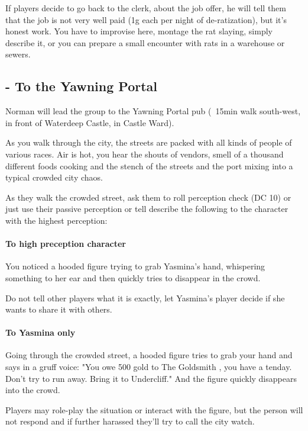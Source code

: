 \documentclass[10pt,onecolumn,twoside,openany,bg=full,layout=true]{dndbook}
\begin{document}
If players decide to go back to the clerk, about the job offer, he will tell them that the job is not very well paid (1g each per night of de-ratization), but it's honest work.
You have to improvise here, montage the rat slaying, simply describe it, or you can prepare a small encounter with rats in a warehouse or sewers.

\subsection{ - To the Yawning Portal}\label{subsec:\arabic{subact_num}-to-the-yawning-portal}
\addtocounter{subact_num}{1}
Norman will lead the group to the Yawning Portal pub (~15min walk south-west, in front of Waterdeep Castle, in Castle Ward).
\begin{DndReadAloud}
As you walk through the city, the streets are packed with all kinds of people of various races.
Air is hot, you hear the shouts of vendors, smell of a thousand different foods cooking and the stench of the streets and the port mixing into a typical crowded city chaos.
\end{DndReadAloud}

As they walk the crowded street, ask them to roll perception check (DC 10) or just use their passive perception or
tell describe the following to the character with the highest perception:
\begin{DndReadAloud}
\paragraph{ To high preception character}
  You noticed a hooded figure trying to grab Yasmina's hand, whispering something to her ear and then quickly tries to disappear in the crowd.
\end{DndReadAloud}
Do not tell other players what it is exactly, let Yasmina's player decide if she wants to share it with others.
\begin{DndReadAloud}
\paragraph{ To Yasmina only}
Going through the crowded street, a hooded figure tries to grab your hand and says in a gruff voice:
"You owe 500 gold to The Goldsmith , you have a tenday.
  Don't try to run away.
  Bring it to Undercliff."
  And the figure quickly disappears into the crowd.
\end{DndReadAloud}
Players may role-play the situation or interact with the figure, but the person will not respond and if further harassed they'll try to call the city watch.
\end{document}
